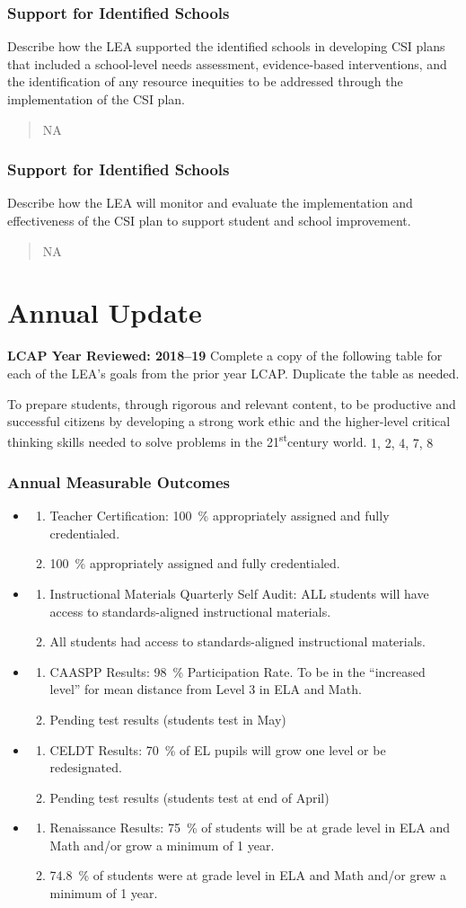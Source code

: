 \documentclass{article}
\makeatletter
\newcommand{\st}{\textsuperscript{st}}
\newcounter{goal}[section] %
\newcommand*{\expact}[1]{%
	\expandafter\@expact\csname c@#1\endcsname%
}
\newcommand*{\@expact}[1]{%
	$\ifcase\intcalcAdd{1}{\intcalcMod{\intcalcSub{#1}{1}}{2}}
		\or{\text{Expected:}}
		\or{\text{Actual:}}
    \else\@ctrerr\fi$
}
\newcommand{\outcome}[2]{
	\item
	\begin{enumerate}[label=\expact*]
	\setlength{\itemsep}{0pt}
	\item #1
	\item #2
	\end{enumerate}
}
\newenvironment{outcomes}
	{
		\subsubsection{Annual Measurable Outcomes}
		\begin{itemize}[label={}]
	}
	{\end{itemize}}
\makeatother
\begin{document}
\subsubsection{Support for Identified Schools}
Describe how the LEA supported the identified schools in developing CSI plans that included a school-level needs assessment, evidence-based interventions, and the identification of any resource inequities to be addressed through the implementation of the CSI plan.
\begin{quotation}
	NA
\end{quotation}

\subsubsection{Support for Identified Schools}
Describe how the LEA will monitor and evaluate the implementation and effectiveness of the CSI plan to support student and school improvement.
\begin{quotation}
	NA
\end{quotation}

\section{Annual Update}
{\bf LCAP Year Reviewed: 2018--19}\newline
Complete a copy of the following table for each of the LEA's goals from the prior year LCAP. Duplicate the table as needed.

\Goal %
	{To prepare students, through rigorous and relevant content, to be productive and successful citizens by developing a strong work ethic and the higher-level critical thinking skills needed to solve problems in the 21\st century world.}
	{1, 2, 4, 7, 8}
	{}

\begin{outcomes}
	\outcome
		{Teacher Certification: \SI{100}{\percent} appropriately assigned and fully credentialed.}
		{\SI{100}{\percent} appropriately assigned and fully credentialed.}
	\outcome
		{Instructional Materials Quarterly Self Audit: ALL students will have access to standards-aligned instructional materials.}
		{All students had access to standards-aligned instructional materials.}
	\outcome
		{CAASPP Results: \SI{98}{\percent} Participation Rate. To be in the ``increased level'' for mean distance from Level 3 in ELA and Math.}
		{Pending test results (students test in May)}
	\outcome
		{CELDT Results: \SI{70}{\percent} of EL pupils will grow one level or be re\-designated.}
		{Pending test results (students test at end of April)}
	\outcome
		{Renaissance Results: \SI{75}{\percent} of students will be at grade level in ELA and Math and/or grow a minimum of 1 year.}
		{\SI{74.8}{\percent} of students were at grade level in ELA and Math and/or grew a minimum of 1 year.}
\end{outcomes}
\end{document}
